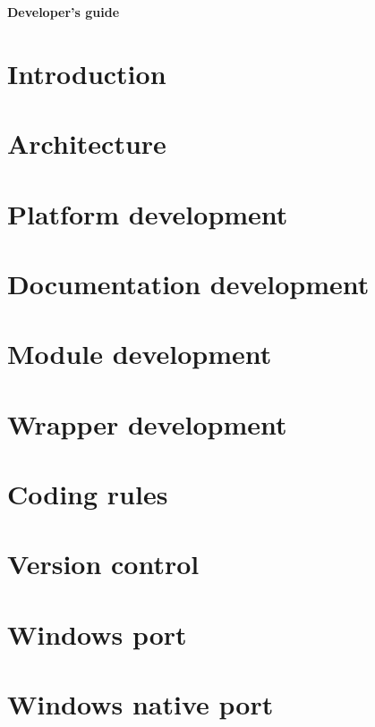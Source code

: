 \documentclass[a4paper,11pt]{article}
\begin{document}
\begin{titlepage}
  \vspace*{2cm}
  \begin{center}
    {\huge \bf Developer's guide}
    
  \end{center}

\end{titlepage}

\newpage

% 

\cleardoublepage
\tableofcontents
\cleardoublepage
\listoffigures
\cleardoublepage
\listoftables
\cleardoublepage

\section*{Introduction}

\cleardoublepage

\section{Architecture}

\cleardoublepage

\section{Platform development}

\cleardoublepage

\section{Documentation development}

\cleardoublepage

\section{Module development}

\cleardoublepage

\section{Wrapper development}

\cleardoublepage

\appendix

\section{Coding rules}

\cleardoublepage

\section{Version control}

\cleardoublepage

\section{Windows port}

\cleardoublepage

\section{Windows native port}

\cleardoublepage

\ifpdf
\cleardoublepage
{}
{}
\fi
\printindex
\end{document}
